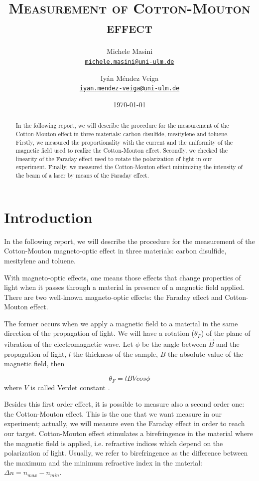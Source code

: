 \documentclass[11pt,a4paper]{article}
\title{\bfseries\textsc{Measurement of Cotton-Mouton effect}}
\author{
Michele Masini\\ \small\texttt{\href{mailto:michele.masini@uni-ulm.de}{michele.masini@uni-ulm.de}}\and
Iyán Méndez Veiga\\ \small\texttt{\href{mailto:iyan.mendez-veiga@uni-ulm.de}{iyan.mendez-veiga@uni-ulm.de}}
}
\date{\today}
\begin{document}
\maketitle

\begin{abstract}
In the following report, we will describe the procedure for the measurement of the Cotton-Mouton effect in three materials: carbon disulfide, mesitylene and toluene. Firstly, we measured the proportionality with the current and the uniformity of the magnetic field used to realize the Cotton-Mouton effect. Secondly, we checked the linearity of the Faraday effect used to rotate the polarization of light in our experiment. Finally, we measured the Cotton-Mouton effect minimizing the intensity of the beam of a laser by means of the Faraday effect.
\end{abstract}

\vspace{1.5cm}

\section{Introduction}

\vspace{.5cm}
In the following report, we will describe the procedure for the measurement of the Cotton-Mouton magneto-optic effect in three materials: carbon disulfide, mesitylene and toluene.

With magneto-optic effects, one means those effects that change properties of light when it passes through a material in presence of a magnetic field applied. There are two well-known magneto-optic effects: the Faraday effect and Cotton-Mouton effect.
	
The former occurs when we apply a magnetic field to a material in the same direction of the propagation of light. We will have a rotation ($\theta_F$) of the plane of vibration of the electromagnetic wave. Let $\phi$ be the angle between $\vec{B}$ and the propagation of light, $l$ the thickness of the sample, $B$ the absolute value of the magnetic field, then

\begin{equation}
\theta_F=lBVcos\phi\label{verd}
\end{equation}
where $V$ is called Verdet constant \cite{cappelli2003cotton}. 

Besides this first order effect, it is possible to measure also a second order one: the Cotton-Mouton effect. This is the one that we want measure in our experiment; actually, we will measure even the Faraday effect in order to reach our target. Cotton-Mouton effect stimulates a birefringence in the material where the magnetic field is applied, i.e. refractive indices which depend on the polarization of light. Usually, we refer to birefringence as the difference between the maximum and the minimum refractive index in the material: $\Delta n=n_{max}-n_{min}$.
\end{document}
